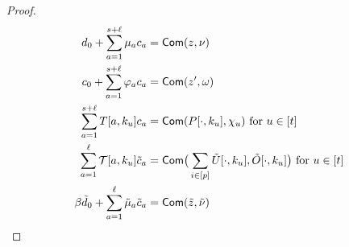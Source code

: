 \begin{proof}
\begin{align}\label{eq:commiteq}
d_0 + \sum_{a=1}^{s+\ell}\mu_ac_a &= \comm(z,\nu) \nonumber \\
c_0 + \sum_{a=1}^{s+\ell}\varphi_ac_a &= \comm(z',\omega) \nonumber \\
\sum_{a=1}^{s+\ell}T[a,k_u]c_a &= \comm(P[\cdot,k_u],\chi_u) \text{ for } u\in [t] \nonumber \\
\sum_{a=1}^{\ell}\mc{T}[a,k_u]\tilde{c}_a &= \comm\big(\sum_{i\in
[p]}\tilde{U}[\cdot,k_u],\tilde{O}[\cdot, k_u]\big) \text{ for } u\in [t] \nonumber \\
\beta\tilde{d}_0 + \sum_{a=1}^{\ell}\tilde{\mu}_a\tilde{c}_a &=
\comm(\tilde{z},\tilde{\nu})
\end{align} 

\end{proof}



